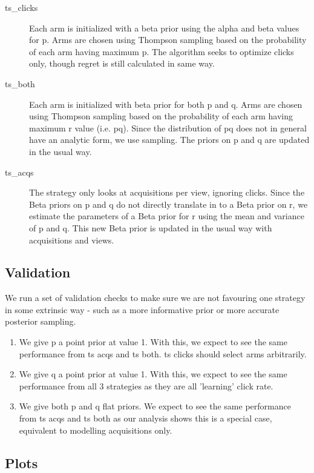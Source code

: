 \documentclass[11pt,a4,singlespacing,titlepagenumber=on]{scrreprt}
\numberwithin{equation}{chapter} %
\theoremstyle{remark}
\begin{document}
\begin{description}
	\item[ts\_clicks] Each arm is initialized with a beta prior using the alpha and beta values for p. Arms are chosen using Thompson sampling based on the probability of each arm having maximum p. The algorithm seeks to optimize clicks only, though regret is still calculated in same way.
	\item[ts\_both] Each arm is initialized with beta prior for both p and q. Arms are chosen using Thompson sampling based on the probability of each arm having maximum r value (i.e. pq). Since the distribution of pq does not in general have an analytic form, we use sampling. The priors on p and q are updated in the usual way.
	\item[ts\_acqs] The strategy only looks at acquisitions per view, ignoring clicks. Since the Beta priors on p and q do not directly translate in to a Beta prior on r, we estimate the parameters of a Beta prior for r using the mean and variance of p and q. This new Beta prior is updated in the usual way with acquisitions and views.
\end{description}

\subsection{Validation}

We run a set of validation checks to make sure we are not favouring one strategy in some extrinsic way - such as a more informative prior or more accurate posterior sampling.

\begin{enumerate}
	\item  We give p a point prior at value 1. With this, we expect to see the same performance from ts acqs and ts both. ts clicks should select arms arbitrarily.
	\item  We give q a point prior at value 1. With this, we expect to see the same performance from all 3 strategies as they are all 'learning' click rate.
	\item  We give both p and q flat priors. We expect to see the same performance from ts acqs and ts both as our analysis shows this is a special case, equivalent to modelling acquisitions only.
\end{enumerate}

\subsection{Plots}
\end{document}
